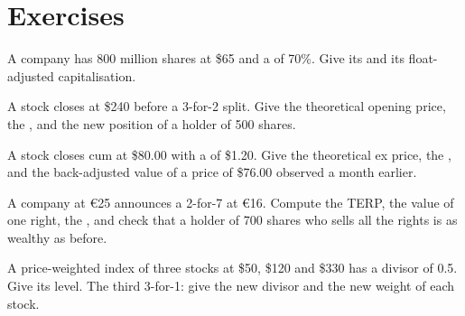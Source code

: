 \section{Exercises}

\begin{exercise}[$\star$]\label{exo:m1:shares-corporate-actions-indices:1}
A company has 800 million shares at \$65 and a  of 70\%. Give its
 and its float-adjusted capitalisation.
\end{exercise}

\begin{exercise}[$\star$]\label{exo:m1:shares-corporate-actions-indices:2}
A stock closes at \$240 before a 3-for-2 split. Give the theoretical opening
price, the , and the new position of a holder of 500
shares.
\end{exercise}

\begin{exercise}[$\star$]\label{exo:m1:shares-corporate-actions-indices:3}
A stock closes cum at \$80.00 with a  of \$1.20. Give the theoretical
ex price, the , and the back-adjusted value of a price of
\$76.00 observed a month earlier.
\end{exercise}

\begin{exercise}[$\star\star$]\label{exo:m1:shares-corporate-actions-indices:4}
A company at \euro 25 announces a 2-for-7  at \euro 16. Compute
the TERP, the value of one right, the , and check that a
holder of 700 shares who sells all the rights is as wealthy as before.
\end{exercise}

\begin{exercise}[$\star\star$]\label{exo:m1:shares-corporate-actions-indices:5}
A price-weighted index of three stocks at \$50, \$120 and \$330 has a divisor
of 0.5. Give its level. The third  3-for-1: give the new divisor
and the new weight of each stock.
\end{exercise}

